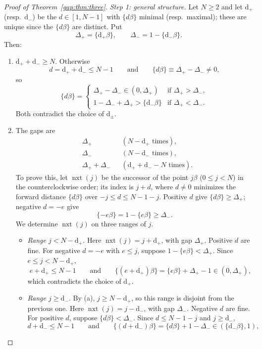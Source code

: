 \begin{proof}[Proof of Theorem~\ref{gap:thm:three}]
\emph{Step 1: general structure.} Let $N\ge2$ and let $\mathrm d_+$ (resp.\ $\mathrm d_-$) be the $d\in[1,N-1]$ with
$\{d\beta\}$ minimal (resp.\ maximal); these are unique since the $\{d\beta\}$ are distinct. Put
\[
\Delta_+=\{\mathrm d_+\beta\},\qquad \Delta_-=1-\{\mathrm d_-\beta\}.
\]
Then:
\begin{enumerate}
\item[(a)] $\mathrm d_++\mathrm d_-\ge N$. Otherwise
\[
d=\mathrm d_++\mathrm d_-\le N-1
\qquad\text{and}\qquad
\{d\beta\}\equiv\Delta_+-\Delta_-\ne0,
\]
so
\[
\{d\beta\}=
\begin{cases}
\Delta_+-\Delta_-\in(0,\Delta_+) & \text{if }\Delta_+>\Delta_-,\\
1-\Delta_-+\Delta_+>\{\mathrm d_-\beta\} & \text{if }\Delta_+<\Delta_-.
\end{cases}
\]
Both contradict the choice of $\mathrm d_\pm$.
\item[(b)] The gaps are
\begin{align*}
&\Delta_+ &&(N-\mathrm d_+\text{ times}),\\
&\Delta_- &&(N-\mathrm d_-\text{ times}),\\
&\Delta_++\Delta_- &&(\mathrm d_++\mathrm d_--N\text{ times}).
\end{align*}
To prove this, let $\operatorname{nxt}(j)$ be the successor of the point $j\beta$ ($0\le j<N$) in the
counterclockwise order; its index is $j+d$, where $d\ne0$ minimizes the forward distance $\{d\beta\}$ over
$-j\le d\le N-1-j$. Positive $d$ give $\{d\beta\}\ge\Delta_+$; negative $d=-e$ give
\[
\{-e\beta\}=1-\{e\beta\}\ge\Delta_-.
\]
We determine $\operatorname{nxt}(j)$ on three ranges of $j$.
 \begin{itemize}
 \item \emph{Range $j<N-\mathrm d_+$.} Here $\operatorname{nxt}(j)=j+\mathrm d_+$, with gap $\Delta_+$.
 Positive $d$ are fine. For negative $d=-e$ with $e\le j$, suppose $1-\{e\beta\}<\Delta_+$.
 Since $e\le j<N-\mathrm d_+$,
 \[
 e+\mathrm d_+\le N-1
 \qquad\text{and}\qquad
 \{(e+\mathrm d_+)\beta\}=\{e\beta\}+\Delta_+-1\in(0,\Delta_+),
 \]
 which contradicts the choice of $\mathrm d_+$.
 \item \emph{Range $j\ge\mathrm d_-$.} By (a), $j\ge N-\mathrm d_+$, so this range is disjoint from the previous one.
 Here $\operatorname{nxt}(j)=j-\mathrm d_-$, with gap $\Delta_-$. Negative $d$ are fine.
 For positive $d$, suppose $\{d\beta\}<\Delta_-$. Since $d\le N-1-j$ and $j\ge\mathrm d_-$,
 \[
 d+\mathrm d_-\le N-1
 \qquad\text{and}\qquad
 \{(d+\mathrm d_-)\beta\}=\{d\beta\}+1-\Delta_-\in(\{\mathrm d_-\beta\},1),
\]
\end{itemize}
\end{enumerate}
\end{proof}

